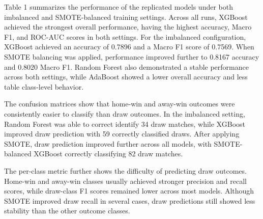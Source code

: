 \documentclass[11pt]{article}
\begin{document}
\begin{table}[t]
\centering
\small
{}
\caption{Replication results across imbalance settings and models.}
\label{tab:replication_results}
\end{table}

Table 1 summarizes the performance of the replicated models under both imbalanced and SMOTE-balanced training settings. Across all runs, XGBoost achieved the strongest overall performance, having the highest accuracy, Macro F1, and ROC-AUC scores in both settings. For the imbalanced configuration, XGBoost achieved an accuracy of 0.7896 and a Macro F1 score of 0.7569. When SMOTE balancing was applied, performance improved further to 0.8167 accuracy and 0.8020 Macro F1. Random Forest also demonstrated a stable performance across both settings, while AdaBoost showed a lower overall accuracy and less table class-level behavior.

The confusion matrices show that home-win and away-win outcomes were consistently easier to classify than draw outcomes. In the imbalanced setting, Random Forest was able to correct identify 34 draw matches, while XGBoost improved draw prediction with 59 correctly classified draws. After applying SMOTE, draw prediction improved further across all models, with SMOTE-balanced XGBoost correctly classifying 82 draw matches.

The per-class metric further shows the difficulty of predicting draw outcomes. Home-win and away-win classes usually achieved stronger precision and recall scores, while draw-class F1 scores remained lower across most models. Although SMOTE improved draw recall in several cases, draw predictions still showed less stability than the other outcome classes.
\end{document}
